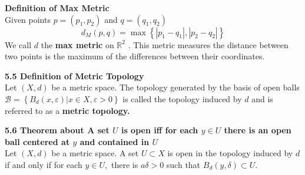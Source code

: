 \documentclass[12pt]{article}
\newcommand{\B}{\mathcal{B}}
\newenvironment{defn}[2][]{\par \medskip \noindent \textbf{#1 Definition of \large#2 \medskip \\}}{\rmfamily \medskip}
\newenvironment{thm}[2][]{\par \medskip \noindent \textbf{#1 Theorem about \large#2 \medskip \\}}{\rmfamily \medskip}
\begin{document}
	\begin{defn}{Max Metric}
		Given points $ p = {(p_1,p_2)} $ and $ q = (q_1,q_2) $
		\[d _ { M } ( p , q ) = \max \left\{ \left| p _ { 1 } - q _ { 1 } \right| , \left| p _ { 2 } - q _ { 2 } \right| \right\}\]
		We call $d$ the\textbf{ max metric} on $\mathbb { R } ^ { 2 }$ . This metric measures the distance between two points is the maximum of the differences between their coordinates.
	\end{defn}
	\begin{defn}[5.5]{Metric Topology}
		Let $( X , d )$ be a metric space. The topology generated by
		the basis of open balls $\B = \left\{ B _ { d } ( x , \varepsilon ) | x \in X , \varepsilon > 0 \right\}$ is called the topology
		induced by $d$ and is referred to as a\textbf{ metric topology.}
	\end{defn}	  
	\begin{thm}[5.6]{A set $ U $ is open iff for each $ y\in U $ there is an open ball centered at $ y $ and contained in $ U $}
		Let $( X , d )$ be a metric space. A set $U \subset X$ is open in the topology induced by $d$ if and only if for each $y \in U ,$ there is $a \delta > 0$ such that
		$B _ { d } ( y , \delta ) \subset U .$
	\end{thm}
\end{document}
